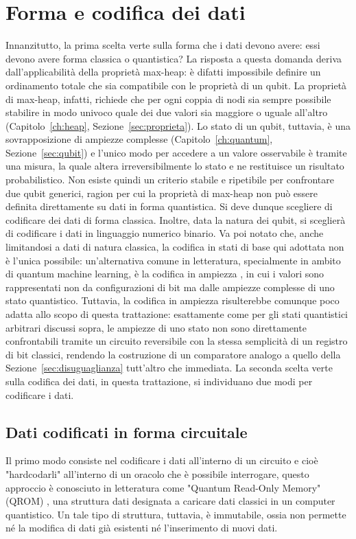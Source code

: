 \section{Forma e codifica dei dati \label{sec:forma-codifica}}
Innanzitutto, la prima scelta verte sulla forma che i dati devono avere: essi devono avere forma classica o quantistica? La risposta a questa domanda deriva dall'applicabilità della proprietà max-heap: è difatti impossibile definire un ordinamento totale che sia compatibile con le proprietà di un qubit. La proprietà di max-heap, infatti, richiede che per ogni coppia di nodi sia sempre possibile stabilire in modo univoco quale dei due valori sia maggiore o uguale all'altro (Capitolo~\ref{ch:heap}, Sezione~\ref{sec:proprieta}). Lo stato di un qubit, tuttavia, è una sovrapposizione di ampiezze complesse (Capitolo~\ref{ch:quantum}, Sezione~\ref{sec:qubit}) e l'unico modo per accedere a un valore osservabile è tramite una misura, la quale altera irreversibilmente lo stato e ne restituisce un risultato probabilistico. Non esiste quindi un criterio stabile e ripetibile per confrontare due qubit generici, ragion per cui la proprietà di max-heap non può essere definita direttamente su dati in forma quantistica. Si deve dunque scegliere di codificare dei dati di forma classica. Inoltre, data la natura dei qubit, si sceglierà di codificare i dati in linguaggio numerico binario. Va poi notato che, anche limitandosi a dati di natura classica, la codifica in stati di base qui adottata non è l'unica possibile: un'alternativa comune in letteratura, specialmente in ambito di quantum machine learning, è la codifica in ampiezza \cite{leap2021survey}, in cui i valori sono rappresentati non da configurazioni di bit ma dalle ampiezze complesse di uno stato quantistico. Tuttavia, la codifica in ampiezza risulterebbe comunque poco adatta allo scopo di questa trattazione: esattamente come per gli stati quantistici arbitrari discussi sopra, le ampiezze di uno stato non sono direttamente confrontabili tramite un circuito reversibile con la stessa semplicità di un registro di bit classici, rendendo la costruzione di un comparatore analogo a quello della Sezione~\ref{sec:disuguaglianza} tutt'altro che immediata. La seconda scelta verte sulla codifica dei dati, in questa trattazione, si individuano due modi per codificare i dati.

\subsection{Dati codificati in forma circuitale \label{sec:forma-circuitale}}
Il primo modo consiste nel codificare i dati all'interno di un circuito e cioè "hardcodarli" all'interno di un oracolo che è possibile interrogare, questo approccio è conosciuto in letteratura come "Quantum Read-Only Memory" (QROM) \cite{Babbush_2018}, una struttura dati designata a caricare dati classici in un computer quantistico. Un tale tipo di struttura, tuttavia, è immutabile, ossia non permette né la modifica di dati già esistenti né l'inserimento di nuovi dati.

